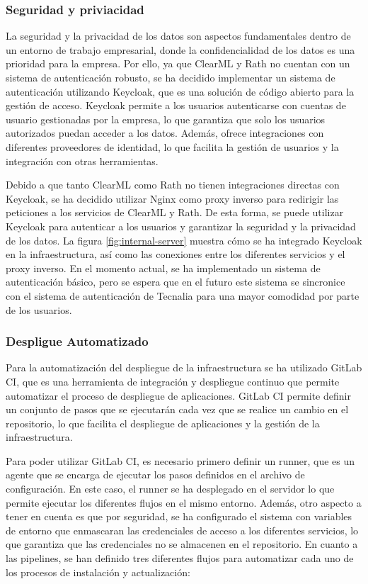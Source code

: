\subsubsection{Seguridad y priviacidad}
La seguridad y la privacidad de los datos son aspectos fundamentales dentro
de un entorno de trabajo empresarial, donde la confidencialidad de los datos
es una prioridad para la empresa. Por ello, ya que ClearML y Rath no cuentan
con un sistema de autenticación robusto, se ha decidido implementar un sistema
de autenticación utilizando Keycloak, que es una solución de código abierto
para la gestión de acceso. Keycloak permite a los usuarios autenticarse con
cuentas de usuario gestionadas por la empresa, lo que garantiza que solo los
usuarios autorizados puedan acceder a los datos. Además, ofrece integraciones
con diferentes proveedores de identidad, lo que facilita la gestión de
usuarios y la integración con otras herramientas.\medskip

Debido a que tanto ClearML como Rath no tienen integraciones directas con
Keycloak, se ha decidido utilizar Nginx como proxy inverso para redirigir
las peticiones a los servicios de ClearML y Rath. De esta forma, se puede
utilizar Keycloak para autenticar a los usuarios y garantizar la seguridad
y la privacidad de los datos. La figura \ref{fig:internal-server} muestra
cómo se ha integrado Keycloak en la infraestructura, así como las conexiones
entre los diferentes servicios y el proxy inverso. En el momento actual, se
ha implementado un sistema de autenticación básico, pero se espera que en el
futuro este sistema se sincronice con el sistema de autenticación de Tecnalia
para una mayor comodidad por parte de los usuarios.

\subsubsection{Despligue Automatizado}
Para la automatización del despliegue de la infraestructura se ha utilizado
GitLab CI, que es una herramienta de integración y despliegue continuo que
permite automatizar el proceso de despliegue de aplicaciones. GitLab CI
permite definir un conjunto de pasos que se ejecutarán cada vez que se
realice un cambio en el repositorio, lo que facilita el despliegue de
aplicaciones y la gestión de la infraestructura.\medskip

Para poder utilizar GitLab CI, es necesario primero definir un runner, que
es un agente que se encarga de ejecutar los pasos definidos en el archivo
de configuración. En este caso, el runner se ha desplegado en el servidor
lo que permite ejecutar los diferentes flujos en el mismo entorno. Además,
otro aspecto a tener en cuenta es que por seguridad, se ha configurado el
sistema con variables de entorno que enmascaran las credenciales de acceso
a los diferentes servicios, lo que garantiza que las credenciales no se
almacenen en el repositorio. En cuanto a las pipelines, se han definido 
tres diferentes flujos para automatizar cada uno de los procesos de 
instalación y actualización:

